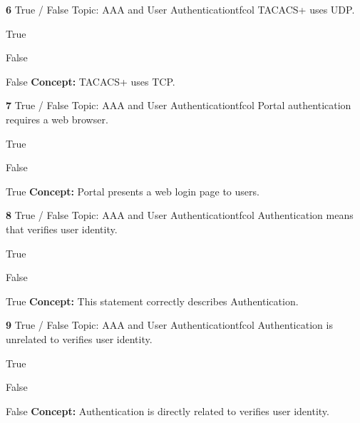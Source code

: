 \documentclass[10pt,a4paper]{article}
\begin{document}
\begin{qcard}{\color{white}\textbf{6} \hfill \small True / False \textbar{} Topic: AAA and User Authentication}{tfcol}
TACACS+ uses UDP.

\begin{qoptions}
\item True
\item False
\end{qoptions}
\begin{explainbox}{False}
\textbf{Concept:} TACACS+ uses TCP.
\end{explainbox}
\end{qcard}

\begin{qcard}{\color{white}\textbf{7} \hfill \small True / False \textbar{} Topic: AAA and User Authentication}{tfcol}
Portal authentication requires a web browser.

\begin{qoptions}
\item True
\item False
\end{qoptions}
\begin{explainbox}{True}
\textbf{Concept:} Portal presents a web login page to users.
\end{explainbox}
\end{qcard}

\begin{qcard}{\color{white}\textbf{8} \hfill \small True / False \textbar{} Topic: AAA and User Authentication}{tfcol}
Authentication means that verifies user identity.

\begin{qoptions}
\item True
\item False
\end{qoptions}
\begin{explainbox}{True}
\textbf{Concept:} This statement correctly describes Authentication.
\end{explainbox}
\end{qcard}

\begin{qcard}{\color{white}\textbf{9} \hfill \small True / False \textbar{} Topic: AAA and User Authentication}{tfcol}
Authentication is unrelated to verifies user identity.

\begin{qoptions}
\item True
\item False
\end{qoptions}
\begin{explainbox}{False}
\textbf{Concept:} Authentication is directly related to verifies user identity.
\end{explainbox}
\end{qcard}
\end{document}
